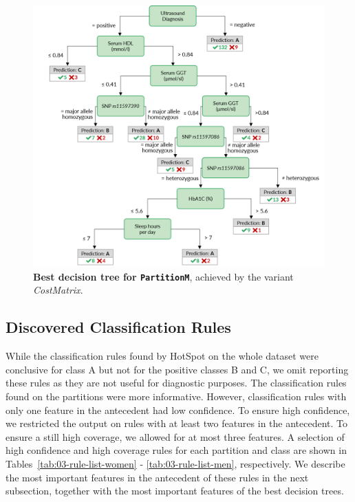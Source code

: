 \documentclass[
  oneside]{book}
\begin{document}
\begin{figure}[htbp]

{\centering \includegraphics[width=1\linewidth]{figures/03-tree-men} 

}

\caption{\textbf{Best decision tree for \texttt{PartitionM}}, achieved by the variant \emph{CostMatrix}.}\label{fig:03-tree-men}
\end{figure}

\hypertarget{imm-experiments-rules}{%
\subsection{Discovered Classification Rules}\label{imm-experiments-rules}}

While the classification rules found by HotSpot on the whole dataset were conclusive for class A but not for the positive classes B and C, we omit reporting these rules as they are not useful for diagnostic purposes.
The classification rules found on the partitions were more informative.
However, classification rules with only one feature in the antecedent had low confidence.
To ensure high confidence, we restricted the output on rules with at least two features in the antecedent.
To ensure a still high coverage, we allowed for at most three features.
A selection of high confidence and high coverage rules for each partition and class are shown in Tables~\ref{tab:03-rule-list-women} - \ref{tab:03-rule-list-men}, respectively.
We describe the most important features in the antecedent of these rules in the next subsection, together with the most important features of the best decision trees.
\end{document}
